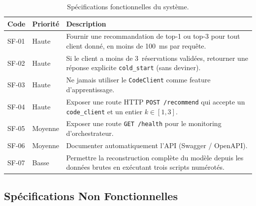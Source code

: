 \documentclass[11pt, a4paper]{article}
\begin{document}
\begin{table}[h]
\centering
\small
\begin{tabularx}{\textwidth}{|l|l|X|}
\hline
\textbf{Code} & \textbf{Priorité} & \textbf{Description} \\
\hline
SF-01 & Haute & Fournir une recommandation de top-1 ou top-3 pour tout
                client donné, en moins de 100~ms par requête. \\
\hline
SF-02 & Haute & Si le client a moins de 3~réservations validées, retourner
                une réponse explicite \texttt{cold\_start} (sans deviner). \\
\hline
SF-03 & Haute & Ne jamais utiliser le \texttt{CodeClient} comme feature
                d'apprentissage. \\
\hline
SF-04 & Haute & Exposer une route HTTP \texttt{POST /recommend} qui accepte
                un \texttt{code\_client} et un entier $k \in [1, 3]$. \\
\hline
SF-05 & Moyenne & Exposer une route \texttt{GET /health} pour le monitoring
                  d'orchestrateur. \\
\hline
SF-06 & Moyenne & Documenter automatiquement l'API (Swagger / OpenAPI). \\
\hline
SF-07 & Basse  & Permettre la reconstruction complète du modèle depuis les
                 données brutes en exécutant trois scripts numérotés. \\
\hline
\end{tabularx}
\caption{Spécifications fonctionnelles du système.}
\end{table}

\subsection{Spécifications Non Fonctionnelles}
\end{document}
